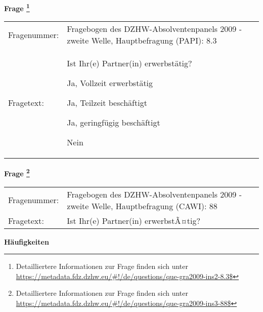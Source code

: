 				\vspace*{0.5cm}
                \noindent\textbf{Frage
	                \footnote{Detailliertere Informationen zur Frage finden sich unter
		              \url{https://metadata.fdz.dzhw.eu/\#!/de/questions/que-gra2009-ins2-8.3$}}}\\
				\begin{tabularx}{\hsize}{@{}lX}
					Fragenummer: &
					  Fragebogen des DZHW-Absolventenpanels 2009 - zweite Welle, Hauptbefragung (PAPI):
					  8.3
 \\
					Fragetext: & Ist Ihr(e) Partner(in) erwerbstätig?\par  Ja, Vollzeit erwerbstätig\par  Ja, Teilzeit beschäftigt\par  Ja, geringfügig beschäftigt\par  Nein \\
				\end{tabularx}
				\vspace*{0.5cm}
                \noindent\textbf{Frage
	                \footnote{Detailliertere Informationen zur Frage finden sich unter
		              \url{https://metadata.fdz.dzhw.eu/\#!/de/questions/que-gra2009-ins3-88$}}}\\
				\begin{tabularx}{\hsize}{@{}lX}
					Fragenummer: &
					  Fragebogen des DZHW-Absolventenpanels 2009 - zweite Welle, Hauptbefragung (CAWI):
					  88
 \\
					Fragetext: & Ist Ihr(e) Partner(in) erwerbstÃ¤tig? \\
				\end{tabularx}





        		\vspace*{0.5cm}
                \noindent\textbf{Häufigkeiten}

